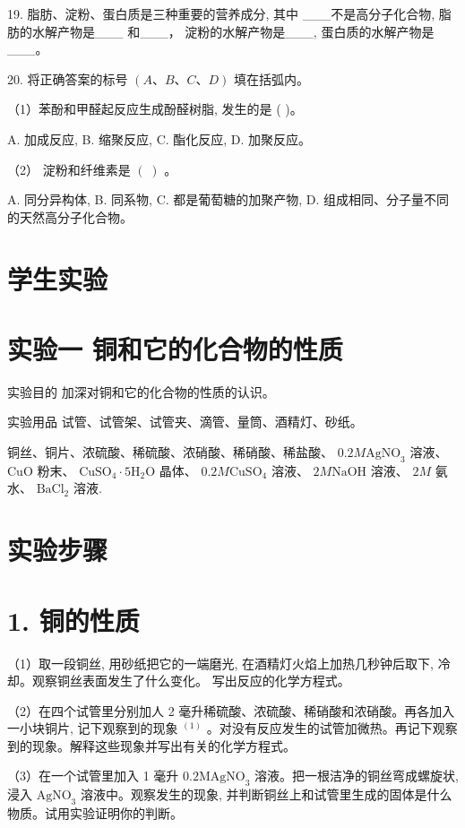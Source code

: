 \documentclass[10pt]{article}
\begin{document}
19. 脂肪、淀粉、蛋白质是三种重要的营养成分, 其中 \_\_\_不是高分子化合物, 脂肪的水解产物是\_\_\_ 和\_\_\_， 淀粉的水解产物是\_\_\_, 蛋白质的水解产物是\_\_\_。

20. 将正确答案的标号 \(\left( {A\text{、}B\text{、}C\text{、}D}\right)\) 填在括弧内。

（1）苯酚和甲醛起反应生成酚醛树脂, 发生的是 ( )。

A. 加成反应, B. 缩聚反应, C. 酯化反应, D. 加聚反应。

（2） 淀粉和纤维素是 \(\left( \;\right)\) 。

A. 同分异构体, B. 同系物, C. 都是葡萄糖的加聚产物, D. 组成相同、分子量不同的天然高分子化合物。

\section*{学生实验}

\section*{实验一 铜和它的化合物的性质}

实验目的 加深对铜和它的化合物的性质的认识。

实验用品 试管、试管架、试管夹、滴管、量筒、酒精灯、砂纸。

铜丝、铜片、浓硫酸、稀硫酸、浓硝酸、稀硝酸、稀盐酸、 \({0.2M}{\mathrm{{AgNO}}}_{3}\) 溶液、 \(\mathrm{{CuO}}\) 粉末、 \({\mathrm{{CuSO}}}_{4} \cdot 5{\mathrm{H}}_{2}\mathrm{O}\) 晶体、 \({0.2M}{\mathrm{{CuSO}}}_{4}\) 溶液、 \({2M}\mathrm{{NaOH}}\) 溶液、 \({2M}\) 氨水、 \({\mathrm{{BaCl}}}_{2}\) 溶液.

\section*{实验步骤}

\section*{1. 铜的性质}

（1）取一段铜丝, 用砂纸把它的一端磨光, 在酒精灯火焰上加热几秒钟后取下, 冷却。观察铜丝表面发生了什么变化。 写出反应的化学方程式。

（2）在四个试管里分别加人 2 毫升稀硫酸、浓硫酸、稀硝酸和浓硝酸。再各加入一小块铜片, 记下观察到的现象 \({}^{\left( 1\right) }\) 。对没有反应发生的试管加微热。再记下观察到的现象。解释这些现象并写出有关的化学方程式。

（3）在一个试管里加入 1 毫升 \({0.2}{\mathrm{{MAgNO}}}_{3}\) 溶液。把一根洁净的铜丝弯成螺旋状,浸入 \({\mathrm{{AgNO}}}_{3}\) 溶液中。观察发生的现象, 并判断铜丝上和试管里生成的固体是什么物质。试用实验证明你的判断。
\end{document}
